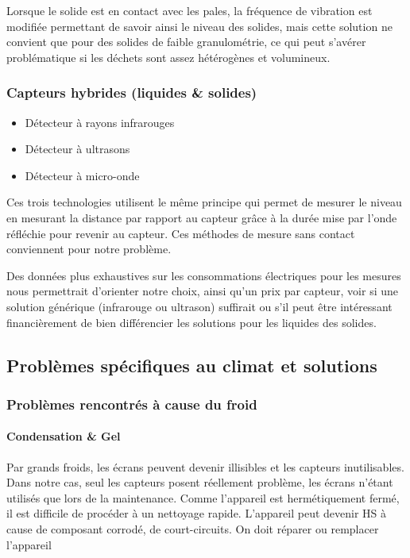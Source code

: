 Lorsque le solide est en contact avec les pales, la fréquence de vibration est modifiée permettant de savoir ainsi le niveau des solides, mais cette solution ne convient que pour des solides de faible granulométrie, ce qui peut s’avérer problématique si les déchets sont assez hétérogènes et volumineux.

\subsubsection{Capteurs hybrides (liquides \&  solides)}

\begin{itemize}
\item Détecteur à rayons infrarouges
\item Détecteur à ultrasons
\item Détecteur à micro-onde
\end{itemize}

Ces trois technologies utilisent le même principe qui permet de mesurer le niveau en mesurant la distance par rapport au capteur grâce à la durée mise par l’onde réfléchie pour revenir au capteur. Ces méthodes de mesure sans contact conviennent pour notre problème.

Des données plus exhaustives sur les consommations électriques pour les mesures nous permettrait d’orienter notre choix, ainsi qu’un prix par capteur, voir si une solution générique (infrarouge ou ultrason) suffirait ou s’il peut être intéressant financièrement de bien différencier les solutions pour les liquides des solides.

\subsection{Problèmes spécifiques au climat et solutions}

\subsubsection{Problèmes rencontrés à cause du froid}

\paragraph{Condensation \&  Gel}

Par grands froids, les écrans peuvent devenir illisibles et les capteurs inutilisables. Dans notre cas, seul les capteurs posent réellement problème, les écrans n'étant utilisés que lors de la maintenance.
Comme l’appareil est hermétiquement fermé, il est difficile de procéder à un nettoyage rapide. L’appareil peut devenir HS à cause de composant corrodé, de court-circuits. On doit réparer ou remplacer l’appareil

